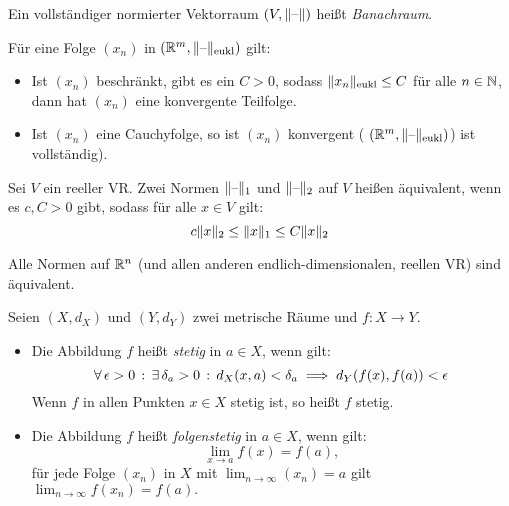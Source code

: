 \documentclass{cheat-sheet}
\begin{document}
\begin{defn}
  Ein vollständiger normierter Vektorraum $(V, \lVert\text{--}\rVert)$ heißt \emph{Banachraum}.
\end{defn}


\begin{satz}
  Für eine Folge $(x_n)$ in $(\mathbb{R}^m, \lVert\text{--}\rVert_{\text{eukl}})$ gilt:

  \begin{itemize}
    \item Ist $(x_n)$ beschränkt, \dh{} gibt es ein $C > 0$, sodass $\lVert x_n\rVert_{\text{eukl}} \le C$ für alle $n \in \mathbb{N}$, dann hat $(x_n)$ eine konvergente Teilfolge.
    \item Ist $(x_n)$ eine Cauchyfolge, so ist $(x_n)$ konvergent (\dh{} $(\mathbb{R}^m, \lVert\text{--}\rVert_{\text{eukl}})$) ist vollständig).
  \end{itemize}
\end{satz}

\begin{defn}
  Sei $V$ ein reeller VR. Zwei Normen $\lVert\text{--}\rVert_1$ und $\lVert\text{--}\rVert_2$ auf $V$ heißen äquivalent, wenn es $c, C > 0$ gibt, sodass für alle $x \in V$ gilt:
  \[ c \lVert x\rVert_2 \le \lVert x\rVert_1 \le C \lVert x\rVert_2 \]
\end{defn}


\begin{satz}
  Alle Normen auf $\mathbb{R}^n$ (und allen anderen endlich-dimensionalen, reellen VR) sind äquivalent.
\end{satz}

\begin{defn}
  Seien $(X, d_X)$ und $(Y, d_Y)$ zwei metrische Räume und $f : X \to Y$.
  \begin{itemize}
    \item Die Abbildung $f$ heißt \emph{stetig} in $a \in X$, wenn gilt:
    \[ \forall \, {\epsilon > 0} \,:\, \exists \, {\delta_a > 0} \,:\, d_X(x, a) < \delta_a \implies d_Y(f(x), f(a)) < \epsilon \]
    Wenn $f$ in allen Punkten $x \in X$ stetig ist, so heißt $f$ stetig.
    \item Die Abbildung $f$ heißt \emph{folgenstetig} in $a \in X$, wenn gilt:
    \[ \lim_{x \to a} f(x) = f(a), \]
    \dh{} für jede Folge $(x_n)$ in $X$ mit $\lim_{n \to \infty} (x_n) = a$ gilt $\lim_{n \to \infty} f(x_n) = f(a).$
  \end{itemize}
\end{defn}
\end{document}
